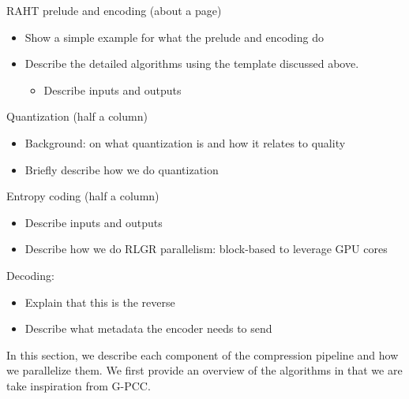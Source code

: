 \begin{outline}
  RAHT prelude and encoding (about a page) \status{[Done]}
  \begin{itemize}
    \item Show a simple example for what the prelude and encoding do
    \item Describe the detailed algorithms using the template discussed above.
      \begin{itemize}
      \item Describe inputs and outputs
      \end{itemize}
  \end{itemize}

  Quantization (half a column) \status{[Done]}
  \begin{itemize}
  \item Background: on what quantization is and how it relates to quality
  \item Briefly describe how we do quantization
  \end{itemize}

  Entropy coding (half a column) \status{[Done]}
  \begin{itemize}
  \item Describe inputs and outputs
  \item Describe how we do RLGR parallelism: block-based to leverage GPU cores
  \end{itemize}

  Decoding: \status{[Done]}
  \begin{itemize}
  \item Explain that this is the reverse
  \item Describe what metadata the encoder needs to send
  \end{itemize}
      
\end{outline}


In this section, we describe each component of the \gsnfs compression pipeline and how we parallelize them. We first provide an overview of the algorithms in that we are take inspiration from G-PCC.

